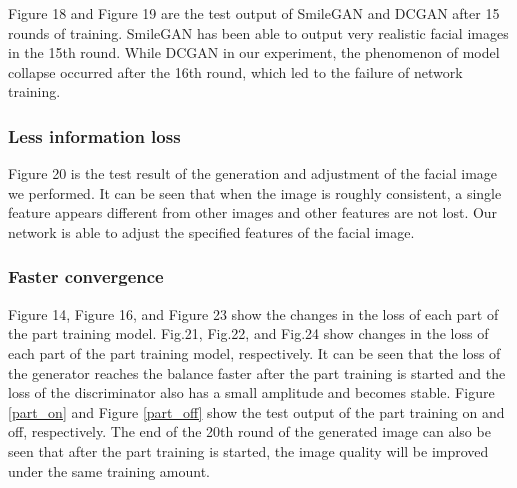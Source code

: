 Figure 18 and Figure 19 are the test output of SmileGAN and DCGAN after 15 rounds of training.
SmileGAN has been able to output very realistic facial images in the 15th round.
While DCGAN in our experiment, the phenomenon of model collapse occurred after the 16th round, which led to the failure of network training.

\subsubsection*{Less information loss}
Figure 20 is the test result of the generation and adjustment of the facial image we performed.
It can be seen that when the image is roughly consistent, a single feature appears different from other images and other features are not lost.
Our network is able to adjust the specified features of the facial image.



\subsubsection*{Faster convergence}
Figure 14, Figure 16, and Figure 23 show the changes in the loss of each part of the part training model.
Fig.21, Fig.22, and Fig.24 show changes in the loss of each part of the part training model, respectively.
It can be seen that the loss of the generator reaches the balance faster after the part training is started and the loss of the discriminator also has a small amplitude and becomes stable.
Figure \ref{part_on} and Figure \ref{part_off} show the test output of the part training on and off, respectively.
The end of the 20th round of the generated image can also be seen that after the part training is started, the image quality will be improved under the same training amount.

